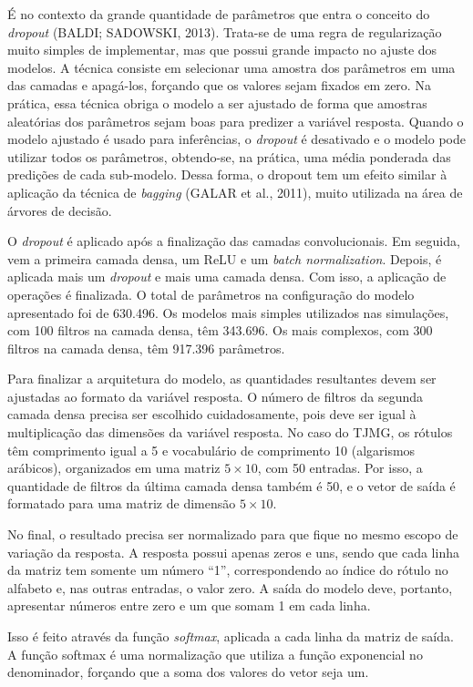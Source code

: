 \documentclass[12pt,twoside,brazilian]{book}
\begin{document}
É no contexto da grande quantidade de parâmetros que entra o conceito do
\emph{dropout} (BALDI; SADOWSKI, 2013). Trata-se de uma regra de
regularização muito simples de implementar, mas que possui grande
impacto no ajuste dos modelos. A técnica consiste em selecionar uma
amostra dos parâmetros em uma das camadas e apagá-los, forçando que os
valores sejam fixados em zero. Na prática, essa técnica obriga o modelo
a ser ajustado de forma que amostras aleatórias dos parâmetros sejam
boas para predizer a variável resposta. Quando o modelo ajustado é usado
para inferências, o \emph{dropout} é desativado e o modelo pode utilizar
todos os parâmetros, obtendo-se, na prática, uma média ponderada das
predições de cada sub-modelo. Dessa forma, o dropout tem um efeito
similar à aplicação da técnica de \emph{bagging} (GALAR et al., 2011),
muito utilizada na área de árvores de decisão.

O \emph{dropout} é aplicado após a finalização das camadas
convolucionais. Em seguida, vem a primeira camada densa, um ReLU e um
\emph{batch normalization}. Depois, é aplicada mais um \emph{dropout} e
mais uma camada densa. Com isso, a aplicação de operações é finalizada.
O total de parâmetros na configuração do modelo apresentado foi de
630.496. Os modelos mais simples utilizados nas simulações, com 100
filtros na camada densa, têm 343.696. Os mais complexos, com 300 filtros
na camada densa, têm 917.396 parâmetros.

Para finalizar a arquitetura do modelo, as quantidades resultantes devem
ser ajustadas ao formato da variável resposta. O número de filtros da
segunda camada densa precisa ser escolhido cuidadosamente, pois deve ser
igual à multiplicação das dimensões da variável resposta. No caso do
TJMG, os rótulos têm comprimento igual a 5 e vocabulário de comprimento
10 (algarismos arábicos), organizados em uma matriz \(5\times10\), com
50 entradas. Por isso, a quantidade de filtros da última camada densa
também é 50, e o vetor de saída é formatado para uma matriz de dimensão
\(5\times10\).

No final, o resultado precisa ser normalizado para que fique no mesmo
escopo de variação da resposta. A resposta possui apenas zeros e uns,
sendo que cada linha da matriz tem somente um número ``1'',
correspondendo ao índice do rótulo no alfabeto e, nas outras entradas, o
valor zero. A saída do modelo deve, portanto, apresentar números entre
zero e um que somam 1 em cada linha.

Isso é feito através da função \emph{softmax}, aplicada a cada linha da
matriz de saída. A função softmax é uma normalização que utiliza a
função exponencial no denominador, forçando que a soma dos valores do
vetor seja um.
\end{document}
